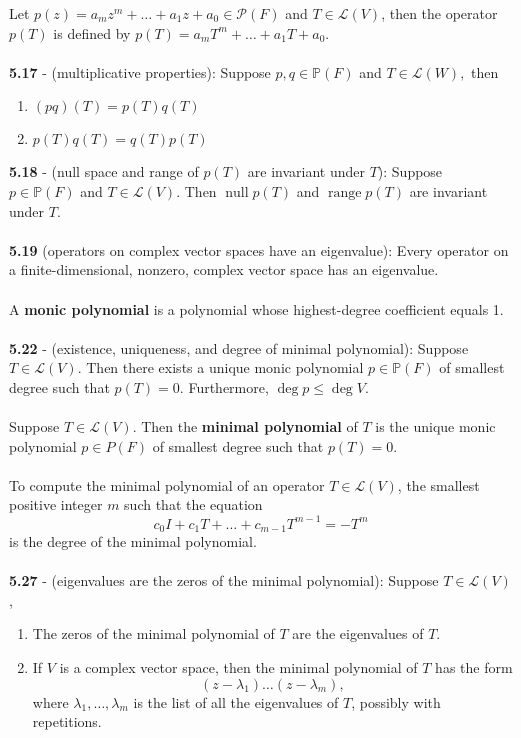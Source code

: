 \documentclass{article}
\DeclareMathOperator{\Null}{null}
\DeclareMathOperator{\Range}{range}
\theoremstyle{definition}
\begin{document}
Let $p(z) = a_mz^m + \dots + a_1z + a_0 \in \mathcal{P}(F)$ and $T \in \mathcal{L}(V)$, then the operator $p(T)$ is defined by $p(T) = a_mT^m + \dots + a_1T + a_0$. \\ \\
\textbf{5.17} - (multiplicative properties): Suppose $p, q \in \mathbb{P}(F)$ and $T \in \mathcal{L}(W),$ then \begin{enumerate}
    \item $(pq)(T) = p(T)q(T)$
    \item $p(T)q(T) = q(T)p(T)$
\end{enumerate} $ $ \\
\textbf{5.18} - (null space and range of $p(T)$ are invariant under $T$): Suppose $p \in \mathbb{P}(F)$ and $T \in \mathcal{L}(V)$. Then $\Null{p(T)}$ and $\Range{p(T)}$ are invariant under $T$. \\ \\
\textbf{5.19} (operators on complex vector spaces have an eigenvalue): Every operator on a finite-dimensional, nonzero, complex vector space has an
eigenvalue. \\ \\
A \textbf{monic polynomial} is a polynomial whose highest-degree coefficient equals 1. \\ \\
\textbf{5.22} - (existence, uniqueness, and degree of minimal polynomial): Suppose $T \in \mathcal{L}(V)$. Then there exists a unique monic polynomial $p \in \mathbb{P}(F)$ of smallest degree such that $p(T) = 0$. Furthermore, $\deg{p} \leq \deg{V}$. \\ \\
Suppose $T \in \mathcal{L}(V)$. Then the \textbf{minimal polynomial} of $T$ is the unique monic polynomial $p \in P(F)$ of smallest degree such that $p(T) = 0$. \\ \\
To compute the minimal polynomial of an operator $T \in \mathcal{L}(V)$, the smallest positive integer $m$ such that the equation $$c_0I + c_1T + \dots + c_{m - 1}T^{m - 1} = -T^m$$is the degree of the minimal polynomial. \\ \\
\textbf{5.27} - (eigenvalues are the zeros of the minimal polynomial): Suppose $T \in \mathcal{L}(V)$, \begin{enumerate}
    \item The zeros of the minimal polynomial of $T$ are the eigenvalues of $T$.
    \item If $V$ is a complex vector space, then the minimal polynomial of $T$ has the form $$(z - \lambda_1)\dots(z - \lambda_m),$$ where $\lambda_1, \dots, \lambda_m$ is the list of all the eigenvalues of $T$, possibly with repetitions.
\end{enumerate} $ $ \\
\end{document}
